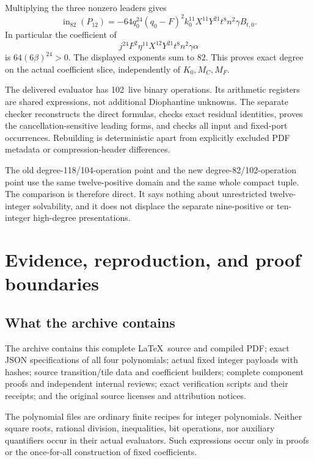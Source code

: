 \documentclass[11pt]{article}
\theoremstyle{remark}\newtheorem{remark}[theorem]{Remark}
\newcommand{\Pcost}{102}
\begin{document}
Multiplying the three nonzero leaders gives
\begin{equation}\label{eq:top82}
 \operatorname{in}_{82}(P_{12})=
 -64q_0^{24}(q_0-F)^2k_0^{11}X^{11}Y^{21}t^8n^2\gamma B_{t,0}.
\end{equation}
In particular the coefficient of
\[
 j^{24}F^2\eta^{11}X^{12}Y^{21}t^8n^2\gamma\alpha
\]
is $64(6\beta)^{24}>0$. The displayed exponents sum to 82. This proves exact degree on the actual coefficient slice, independently of $K_0,M_C,M_F$.

The delivered evaluator has \Pcost\ live binary operations. Its arithmetic registers are shared expressions, not additional Diophantine unknowns. The separate checker reconstructs the direct formulas, checks exact residual identities, proves the cancellation-sensitive leading forms, and checks all input and fixed-port occurrences. Rebuilding is deterministic apart from explicitly excluded PDF metadata or compression-header differences.

The old degree-118/104-operation point and the new degree-82/\Pcost-operation point use the same twelve-positive domain and the same whole compact tuple. The comparison is therefore direct. It says nothing about unrestricted twelve-integer solvability, and it does not displace the separate nine-positive or ten-integer high-degree presentations.

\section{Evidence, reproduction, and proof boundaries}\label{sec:status}

\subsection{What the archive contains}

The archive contains this complete \LaTeX\ source and compiled PDF; exact JSON specifications of all four polynomials; actual fixed integer payloads with hashes; source transition/tile data and coefficient builders; complete component proofs and independent internal reviews; exact verification scripts and their receipts; and the original source licenses and attribution notices.

The polynomial files are ordinary finite recipes for integer polynomials. Neither square roots, rational division, inequalities, bit operations, nor auxiliary quantifiers occur in their actual evaluators. Such expressions occur only in proofs or the once-for-all construction of fixed coefficients.
\end{document}
